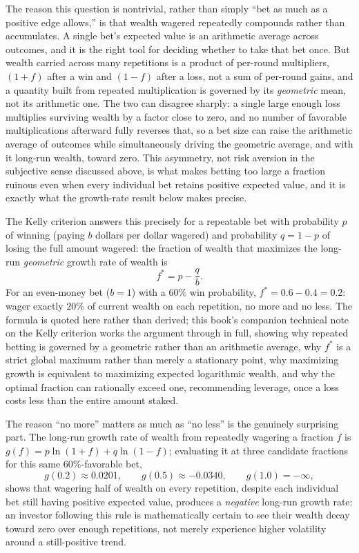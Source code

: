 \documentclass[../ai_in_finance]{subfiles}
\begin{document}
The reason this question is nontrivial, rather than simply ``bet as much as a positive edge allows,'' is that wealth wagered repeatedly compounds rather than accumulates. A single bet's expected value is an arithmetic average across outcomes, and it is the right tool for deciding whether to take that bet once.
But wealth carried across many repetitions is a product of per-round multipliers, $(1+f)$ after a win and $(1-f)$ after a loss, not a sum of per-round gains, and a quantity built from repeated multiplication is governed by its \emph{geometric} mean, not its arithmetic one. The two can disagree sharply: a single large enough loss multiplies surviving wealth by a factor close to zero, and no number of favorable multiplications afterward fully reverses that, so a bet size can raise the arithmetic average of outcomes while simultaneously driving the geometric average, and with it long-run wealth, toward zero. This asymmetry, not risk aversion in the subjective sense discussed above, is what makes betting too large a fraction ruinous even when every individual bet retains positive expected value, and it is exactly what the growth-rate result below makes precise.

The Kelly criterion answers this precisely for a repeatable bet with probability $p$ of winning (paying $b$ dollars per dollar wagered) and probability $q=1-p$ of losing the full amount wagered: the fraction of wealth that maximizes the long-run \emph{geometric} growth rate of wealth is
\begin{equation*}
f^* = p - \frac{q}{b}.
\end{equation*}
For an even-money bet ($b=1$) with a $60\%$ win probability, $f^* = 0.6 - 0.4 = 0.2$: wager exactly $20\%$ of current wealth on each repetition, no more and no less. The formula is quoted here rather than derived; this book's companion technical note on the Kelly criterion works the argument through in full, showing why repeated betting is governed by a geometric rather than an arithmetic average, why $f^*$ is a strict global maximum rather than merely a stationary point, why maximizing growth is equivalent to maximizing expected logarithmic wealth, and why the optimal fraction can rationally exceed one, recommending leverage, once a loss costs less than the entire amount staked.

The reason ``no more'' matters as much as ``no less'' is the genuinely surprising part. The long-run growth rate of wealth from repeatedly wagering a fraction $f$ is $g(f) = p\ln(1+f) + q\ln(1-f)$; evaluating it at three candidate fractions for this same $60\%$-favorable bet,
\begin{equation*}
g(0.2) \approx 0.0201, \qquad g(0.5) \approx -0.0340, \qquad g(1.0) = -\infty,
\end{equation*}
shows that wagering half of wealth on every repetition, despite each individual bet still having positive expected value, produces a \emph{negative} long-run growth rate: an investor following this rule is mathematically certain to see their wealth decay toward zero over enough repetitions, not merely experience higher volatility around a still-positive trend.
\end{document}
